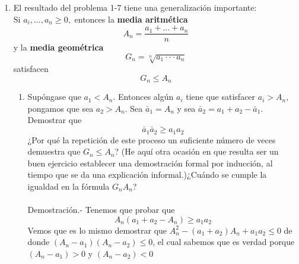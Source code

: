 \begin{enumerate}[\bfseries 1.]
       \item El resultado del problema 1-7 tiene una generalización importante:\\
          Si $a_i,...,a_n \geq 0,$ entonces la \textbf{media aritmética} 
          $$A_n=\dfrac{a_1+...+a_n}{n}$$
          y la \textbf{media geométrica}
          $$G_n=\sqrt[n]{a_1\cdot \cdot \cdot a_n}$$
          satisfacen
          $$G_n \leq A_n$$
          \begin{enumerate}[\bfseries (a)]
             \item Supóngase que $a_1<A_n.$ Entonces algún $a_i$ tiene que satisfacer $a_i>A_n$, pongamos que sea $a_2>A_n$. Sea $\bar{a}_1 = A_n$ y sea $\bar{a}_2=a_1+a_2 - \bar{a}_1$. Demostrar que $$\bar{a}_1 \bar{a}_2 \geq a_1 a_2$$ 
                ¿Por qué la repetición de este proceso un suficiente número de veces demuestra que $G_n \leq A_n$? (He aquí otra ocasión en que resulta ser un buen ejercicio establecer una demostración formal por inducción, al tiempo que se da una explicación informal.)¿Cuándo se cumple la igualdad en la fórmula $G_n A_n$?\\\\
		  Demostración.-\; Tenemos que probar que $$A_n (a_1+a_2-A_n)\geq a_1 a_2$$ 
		  Vemos que es lo mismo demostrar que $A_n^2 - (a_1 + a_2)A_n + a_1 a_2 \leq 0$ de donde $(A_n - a_1)(A_n-a_2)\leq 0$, el cual sabemos que es verdad porque $(A_n -a_1)>0$ y $(A_n - a_2)<0$\\\\


\end{enumerate}
\end{enumerate}

